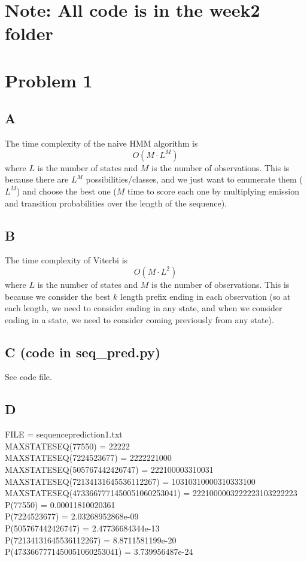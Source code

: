 \documentclass{article}
\begin{document}
\section*{Note: All code is in the week2 folder}
\section*{Problem 1}
\subsection*{A}
The time complexity of the naive HMM algorithm is
\[ O(M \cdot L^M) \]
where $L$ is the number of states and $M$ is the number of observations.
This is because there are $L^M$ possibilities/classes, and we just want to enumerate
them ($L^M$) and choose the best one ($M$ time to score each one by multiplying
emission and transition probabilities over the length of the sequence).

\subsection*{B}
The time complexity of Viterbi is
\[ O(M \cdot L^2) \]
where $L$ is the number of states and $M$ is the number of observations.
This is because we consider the best $k$ length prefix ending in each observation (so at
each length, we need to consider ending in any state, and when we consider
ending in a state, we need to consider coming previously from any state).

\subsection*{C (code in seq\_pred.py)}
See code file.

\subsection*{D}
FILE =  sequenceprediction1.txt \\
MAXSTATESEQ(77550) = 22222 \\
MAXSTATESEQ(7224523677) = 2222221000 \\
MAXSTATESEQ(505767442426747) = 222100003310031 \\
MAXSTATESEQ(72134131645536112267) = 10310310000310333100 \\
MAXSTATESEQ(4733667771450051060253041) = 2221000003222223103222223 \\
P(77550) = 0.00011810020361  \\
P(7224523677) = 2.03268952868e-09  \\
P(505767442426747) = 2.47736684344e-13  \\
P(72134131645536112267) = 8.8711581199e-20  \\
P(4733667771450051060253041) = 3.739956487e-24  \\
\end{document}
